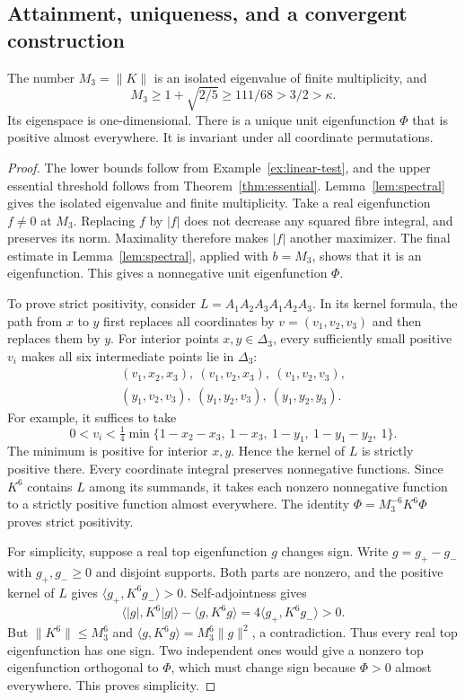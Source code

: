 \documentclass[11pt]{article}
\newcommand{\D}{\Delta}
\newcommand{\ip}[2]{\langle #1,#2\rangle}
\newcommand{\norm}[1]{\lVert #1\rVert}
\begin{document}
\subsection{Attainment, uniqueness, and a convergent construction}

\begin{theorem}\label{thm:attainment}
The number $M_3=\norm K$ is an isolated eigenvalue of finite multiplicity,
and
\[
              M_3\geq1+\sqrt{2/5}\geq111/68>3/2>\kappa.
\]
Its eigenspace is one-dimensional.  There is a unique unit eigenfunction
$\Phi$ that is positive almost everywhere.
It is invariant under all coordinate permutations.
\end{theorem}

\begin{proof}
The lower bounds follow from Example~\ref{ex:linear-test}, and the upper
essential threshold follows from Theorem~\ref{thm:essential}.
Lemma~\ref{lem:spectral} gives the isolated eigenvalue and finite multiplicity.
Take a real eigenfunction $f\ne0$ at $M_3$.
Replacing $f$ by $|f|$ does not decrease any squared fibre integral,
and preserves its norm.  Maximality therefore makes $|f|$ another
maximizer.  The final estimate in Lemma~\ref{lem:spectral}, applied
with $b=M_3$, shows that it is an eigenfunction.
This gives a nonnegative unit eigenfunction $\Phi$.

To prove strict positivity, consider
$L=A_1A_2A_3A_1A_2A_3$.
In its kernel formula, the path from $x$ to $y$ first replaces all
coordinates by $v=(v_1,v_2,v_3)$ and then replaces them by $y$.
For interior points $x,y\in\D_3$, every sufficiently small positive
$v_i$ makes all six intermediate points lie in $\D_3$:
\[
 \begin{gathered}
 (v_1,x_2,x_3),\ (v_1,v_2,x_3),\ (v_1,v_2,v_3),\\
 (y_1,v_2,v_3),\ (y_1,y_2,v_3),\ (y_1,y_2,y_3).
 \end{gathered}
\]
For example, it suffices to take
\[
 0<v_i<\tfrac14\min\{1-x_2-x_3,\ 1-x_3,\ 1-y_1,
                                      \ 1-y_1-y_2,\ 1\}.
\]
The minimum is positive for interior $x,y$.
Hence the kernel of $L$ is strictly positive there.
Every coordinate integral preserves nonnegative functions.
Since $K^6$ contains $L$ among its summands,
it takes each nonzero nonnegative function to a strictly positive
function almost everywhere.  The identity
$\Phi=M_3^{-6}K^6\Phi$ proves strict positivity.

For simplicity, suppose a real top eigenfunction $g$ changes sign.
Write $g=g_+-g_-$ with $g_+,g_-\geq0$ and disjoint supports.
Both parts are nonzero, and the positive kernel of $L$ gives
$\ip{g_+}{K^6g_-}>0$.
Self-adjointness gives
\[
 \ip{|g|}{K^6|g|}-\ip g{K^6g}=4\ip{g_+}{K^6g_-}>0.
\]
But $\norm{K^6}\leq M_3^6$ and
$\ip g{K^6g}=M_3^6\norm g^2$, a contradiction.
Thus every real top eigenfunction has one sign.
Two independent ones would give a nonzero top eigenfunction orthogonal
to $\Phi$, which must change sign because $\Phi>0$ almost everywhere.
This proves simplicity.


\end{proof}
\end{document}
